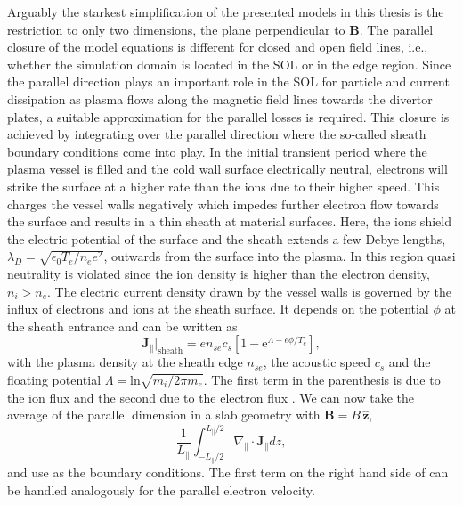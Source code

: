Arguably the starkest simplification of the presented models in this thesis is the restriction to only two dimensions, the plane perpendicular to \textbf{B}. The parallel closure of the model equations is different for closed and open field lines, i.e., whether the simulation domain is located in the SOL or in the edge region. Since the parallel direction plays an important role in the SOL for particle and current dissipation as plasma flows along the magnetic field lines towards the divertor plates, a suitable approximation for the parallel losses is required. This closure is achieved by integrating over the parallel direction where the so-called sheath boundary conditions come into play. In the initial transient period where the plasma vessel is filled and the cold wall surface electrically neutral, electrons will strike the surface at a higher rate than the ions due to their higher speed. This charges the vessel walls negatively which impedes further electron flow towards the surface and results in a thin sheath at material surfaces. Here, the ions shield the electric potential of the surface and the sheath extends a few Debye lengths, $\lambda_D = \sqrt{\epsilon_0T_e/n_ee^2}$, outwards from the surface into the plasma. In this region quasi neutrality is violated since the ion density is higher than the electron density, $n_i > n_e$. The electric current density drawn by the vessel walls is governed by the influx of electrons and ions at the sheath surface. It depends on the potential $\phi$ at the sheath entrance and can be written as
\begin{equation}\label{parallel_flux}
	\textbf{J}_\parallel|_{\mathrm{sheath}} = en_{se}c_s \left[1 - \text{e}^{\Lambda-e{\phi}/{T_e}}\right],
\end{equation}
with the plasma density at the sheath edge $n_{se}$, the acoustic speed $c_s$ and the floating potential $\Lambda=\mathrm{ln}\sqrt{m_i/2\pi m_e}$. The first term in the parenthesis is due to the ion flux and the second due to the electron flux \cite{stangeby2000plasma}. %
We can now take the average of the parallel dimension in a slab geometry with $\textbf{B} = B\, \widehat{\textbf{z}}$,
\begin{equation}\label{v_parallel}
\frac{1}{L_\parallel} \int_{-L_\parallel/2}^{L_\parallel/2} \nabla_\parallel \cdot \textbf{J}_\parallel dz,
\end{equation}
and use  as the boundary conditions. The first term on the right hand side of  can be handled analogously for the parallel electron velocity. 

